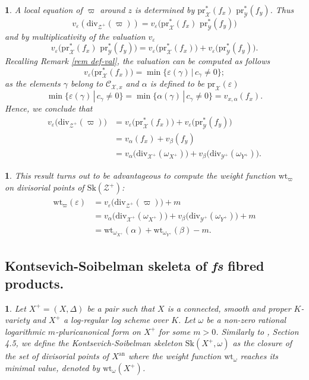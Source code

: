 \documentclass{amsart}%
\numberwithin{equation}{subsection}
\theoremstyle{plain2}
\theoremstyle{definition2}
\theoremstyle{stepstyle}
\theoremstyle{point}
\theoremstyle{subpoint}
\newtheorem{subpoint}[equation]{}%
\newcommand{\spa}[1]{\begin{subpoint}#1\end{subpoint}}           %
\newcommand{\cX}{\ensuremath{\mathscr{X}}}
\newcommand{\caC}{\ensuremath{\mathcal{C}}}
\newcommand{\cY}{\ensuremath{\mathscr{Y}}}
\newcommand{\cZ}{\ensuremath{\mathscr{Z}}}
\renewcommand{\cZ}{\ensuremath{\mathscr{Z}}}
\renewcommand{\cY}{\ensuremath{\mathscr{Y}}}
\newcommand{\pr}{\mathrm{pr}}
\newcommand{\divisor}{\mathrm{div}}
\newcommand{\weight}{\mathrm{wt}}
\newcommand{\Sk}{\mathrm{Sk}}
\begin{document}
\spa{A local equation of $\varpi$ around $z$ is determined by $\pr_{\cX}^*(f_x)\,\,\pr_{\cY}^*(f_y)$. Thus $$v_{\varepsilon}(\divisor_{\cZ^+}(\varpi))
= v_{\varepsilon}\big(\pr_{\cX}^*(f_x) \,\,\pr_{\cY}^*(f_y)\big)$$ and by multiplicativity of the valuation $v_{\varepsilon}$ $$v_{\varepsilon}\big(\pr_{\cX}^*(f_x) \,\,\pr_{\cY}^*(f_y)\big) = v_{\varepsilon}\big(\pr_{\cX}^*(f_x)\big) + v_{\varepsilon}\big(\pr_{\cY}^*(f_y)\big).$$ Recalling Remark \ref{rem def-val}, the valuation can be computed as follows $$ v_{\varepsilon}\big(\pr_{\cX}^*(f_x)\big) = \min\{\varepsilon(\gamma)\,|\,c_\gamma \neq 0\};$$ as the elements $\gamma$ belong to $\caC_{\cX,x}$ and $\alpha$ is defined to be $\pr_{\cX}(\varepsilon)$ $$\min\{\varepsilon(\gamma)\,|\,c_\gamma \neq 0\} = \min\{\alpha(\gamma)\,|\,c_\gamma \neq 0\} =  v_{x,\alpha}(f_x).$$ Hence, we conclude that \begin{align*}
v_{\varepsilon}\big(\divisor_{\cZ^+}(\varpi)\big)
& = v_{\varepsilon}\big(\pr_{\cX}^*(f_x)\big) + v_{\varepsilon}\big(\pr_{\cY}^*(f_y)\big)\\
& = v_{\alpha}(f_x) + v_{\beta}(f_y) \\
& = v_{\alpha}\big(\divisor_{\cX^+}(\omega_{X^+})\big) + v_{\beta}\big(\divisor_{\cY^+}(\omega_{Y^+})\big).
\end{align*}
}

\spa{This result turns out to be advantageous to compute the weight function $\weight_\varpi$ on divisorial points of $\Sk(\cZ^+)$: 
\begin{align} \label{equ weight function product}
\begin{split}
\weight_\varpi(\varepsilon)
& = v_{\varepsilon}\big(\divisor_{\cZ^+}(\varpi)\big) +m \\
& = v_{\alpha}\big(\divisor_{\cX^+}(\omega_{X^+})\big) + v_{\beta}\big(\divisor_{\cY^+}(\omega_{Y^+})\big) + m \\
& = \weight_{\omega_{X^+}}(\alpha) + \weight_{\omega_{Y^+}}(\beta) - m.
\end{split}
\end{align}
}

\subsection{Kontsevich-Soibelman skeleta of \textit{fs} fibred products.}
\spa{Let $X^+=(X,\Delta)$ be a pair such that $X$ is a connected, smooth and proper $K$-variety and $X^+$ a log-regular log scheme over $K$. Let $\omega$ be a non-zero rational logarithmic $m$-pluricanonical form on $X^+$ for some $m>0$. Similarly to \cite{MustataNicaise}, Section 4.5, we define the Kontsevich-Soibelman skeleton $\Sk(X^+, \omega)$ as the closure of the set of divisorial points of $X^\text{an}$ where the weight function $\weight_\omega$ reaches its minimal value, denoted by $\weight_{\omega}(X^+)$.}
\end{document}
